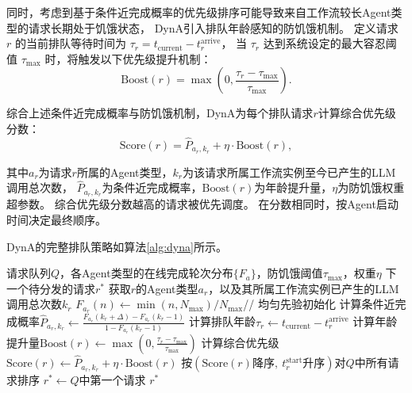 同时，考虑到基于条件近完成概率的优先级排序可能导致来自工作流较长Agent类型的请求长期处于饥饿状态，
DynA引入排队年龄感知的防饥饿机制。
定义请求 $r$ 的当前排队等待时间为 $\tau_r = t_{\text{current}} - t_r^{\text{arrive}}$，
当 $\tau_r$ 达到系统设定的最大容忍阈值 $\tau_{\max}$ 时，将触发以下优先级提升机制：
\begin{equation}\label{eq:age-boost}
  \text{Boost}\left(r\right) = \max\left(0, \frac{\tau_r - \tau_{\max}}{\tau_{\max}}\right).
\end{equation}

综合上述条件近完成概率与防饥饿机制，DynA为每个排队请求$r$计算综合优先级分数：
\begin{equation}\label{eq:priority-score}
  \text{Score}\left(r\right) = \hat{P}_{a_r, k_r} + \eta \cdot \text{Boost}\left(r\right),
\end{equation}

\noindent 其中$a_r$为请求$r$所属的Agent类型，$k_r$为该请求所属工作流实例至今已产生的LLM调用总次数，
$\hat{P}_{a_r, k_r}$为条件近完成概率，$\text{Boost}\left(r\right)$为年龄提升量，$\eta$为防饥饿权重超参数。
综合优先级分数越高的请求被优先调度。
在分数相同时，按Agent启动时间决定最终顺序。

DynA的完整排队策略如算法\ref{alg:dyna}所示。
\begin{algorithm}[htbp]
  \caption{动态感知排队算法（DynA）}
  \label{alg:dyna}
  \begin{algorithmic}[1]
    \REQUIRE 请求队列$Q$，各Agent类型的在线完成轮次分布$\{F_a\}$，防饥饿阈值$\tau_{\max}$，权重$\eta$
    \ENSURE 下一个待分发的请求$r^*$
    \STATE 获取$r$的Agent类型$a_r$，以及其所属工作流实例已产生的LLM调用总次数$k_r$
      \STATE $F_{a_r}\left(n\right) \leftarrow \min\left(n, N_{\max}\right) / N_{\max}$\quad // 均匀先验初始化
    \ENDIF
    \STATE 计算条件近完成概率$\hat{P}_{a_r, k_r} \leftarrow \frac{F_{a_r}\left(k_r + \Delta\right) - F_{a_r}\left(k_r - 1\right)}{1 - F_{a_r}\left(k_r - 1\right)}$
    \STATE 计算排队年龄$\tau_r \leftarrow t_{\text{current}} - t_r^{\text{arrive}}$
    \STATE 计算年龄提升量$\text{Boost}\left(r\right) \leftarrow \max\left(0, \frac{\tau_r - \tau_{\max}}{\tau_{\max}}\right)$
    \STATE 计算综合优先级$\text{Score}\left(r\right) \leftarrow \hat{P}_{a_r, k_r} + \eta \cdot \text{Boost}\left(r\right)$
    \ENDFOR
    \STATE 按$\left(\text{Score}\left(r\right)\text{降序},\ t_r^{\text{start}}\text{升序}\right)$对$Q$中所有请求排序
    \STATE $r^* \leftarrow Q$中第一个请求
    \RETURN $r^*$
  \end{algorithmic}
\end{algorithm}

